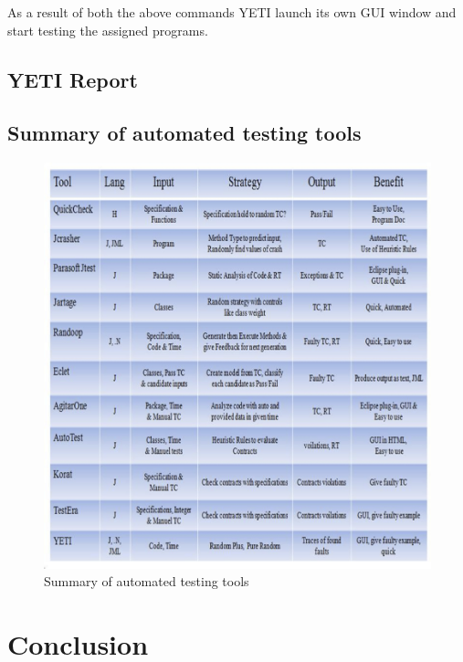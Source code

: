 As a result of both the above commands YETI launch its own GUI window and start testing the assigned programs. 




\subsection{YETI Report}



\subsection{Summary of automated testing tools}


\begin{figure}[h]
	\centering
	\includegraphics[scale=0.6]{Literature/tools.jpg}
	\caption{Summary of automated testing tools}
\end{figure}


\section{Conclusion}




